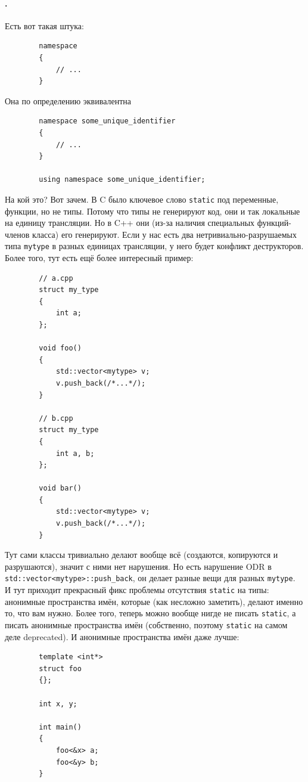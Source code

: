 \documentclass{article}
\begin{document}
    \paragraph{.}
    Есть вот такая штука:
    \begin{verbatim}
        namespace
        {
            // ...
        }
    \end{verbatim}
    Она по определению эквивалентна
    \begin{verbatim}
        namespace some_unique_identifier
        {
            // ...
        }

        using namespace some_unique_identifier;
    \end{verbatim}
    На кой это? Вот зачем. В C было ключевое слово \texttt{static} под переменные, функции, но не типы. Потому что типы не генерируют код, они и так локальные на единицу трансляции. Но в C++ они (из-за наличия специальных функций-членов класса) его генерируют. Если у нас есть два нетривиально-разрушаемых типа \texttt{mytype} в разных единицах трансляции, у него будет конфликт деструкторов. Более того, тут есть ещё более интересный пример:
    \begin{verbatim}
        // a.cpp
        struct my_type
        {
            int a;
        };
    
        void foo()
        {
            std::vector<mytype> v;
            v.push_back(/*...*/);
        }

        // b.cpp
        struct my_type
        {
            int a, b;
        };
        
        void bar()
        {
            std::vector<mytype> v;
            v.push_back(/*...*/);
        }
    \end{verbatim}
    Тут сами классы тривиально делают вообще всё (создаются, копируются и разрушаются), значит с ними нет нарушения. Но есть нарушение ODR в \texttt{std::vector<mytype>::push_back}, он делает разные вещи для разных \texttt{mytype}.\\
    И тут приходит прекрасный фикс проблемы отсутствия \texttt{static} на типы: анонимные пространства имён, которые (как несложно заметить), делают именно то, что вам нужно. Более того, теперь можно вообще нигде не писать \texttt{static}, а писать анонимные пространства имён (собственно, поэтому \texttt{static} на самом деле deprecated). И анонимные пространства имён даже лучше:
    \begin{verbatim}
        template <int*>
        struct foo
        {};

        int x, y;

        int main()
        {
            foo<&x> a;
            foo<&y> b;
        }
    \end{verbatim}
\end{document}

